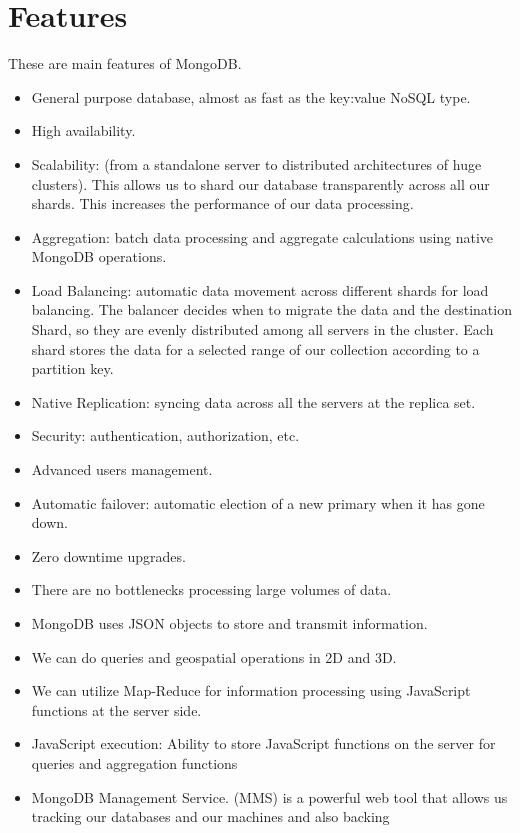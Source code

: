 \documentclass[9pt,twocolumn,twoside]{../../styles/osajnl}
\begin{document}
\section{Features}

These are main features of MongoDB.\cite{www-mongo11}
\begin{itemize}
\item General purpose database, almost as fast as the key:value NoSQL type.

\item High availability.
\item Scalability: (from a standalone server to distributed
  architectures of huge clusters). This allows us to shard our
  database transparently across all our shards. This increases the
  performance of our data processing.
\item Aggregation: batch data processing and aggregate calculations
  using native MongoDB operations.
\item Load Balancing: automatic data movement across different shards
  for load balancing. The balancer decides when to migrate the data
  and the destination Shard, so they are evenly distributed among all
  servers in the cluster. Each shard stores the data for a selected
  range of our collection according to a partition key.
\item Native Replication: syncing data across all the servers at the
  replica set.
\item Security: authentication, authorization, etc.
\item Advanced users management.
\item Automatic failover: automatic election of a new primary when it
  has gone down.
\item Zero downtime upgrades.
\item There are no bottlenecks processing large volumes of data.
\item MongoDB uses JSON objects to store and transmit information.
\item We can do queries and geospatial operations in 2D and 3D.
\item We can utilize Map-Reduce for information processing using
  JavaScript functions at the server side.
\item JavaScript execution: Ability to store JavaScript functions on
  the server for queries and aggregation functions
\item MongoDB Management Service. (MMS) is a powerful web tool that
  allows us tracking our databases and our machines and also backing

\end{itemize}
\end{document}
